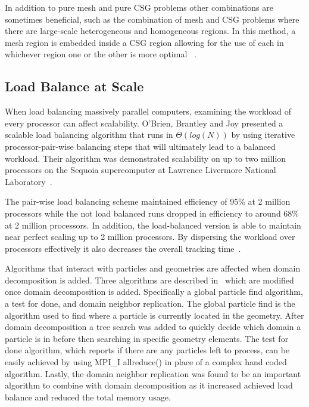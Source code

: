 In addition to pure mesh and pure CSG problems other combinations are sometimes beneficial, such as the combination of mesh and CSG problems where there are large-scale heterogeneous and homogeneous regions.
%
In this method, a mesh region is embedded inside a CSG region allowing for the use of each in whichever region one or the other is more optimal
~\cite{greenman2009enhancements}.

\subsection*{Load Balance at Scale}

%
When load balancing massively parallel computers, 
examining the workload of every processor can affect scalability.
%
O'Brien, Brantley and Joy presented a scalable load balancing algorithm that runs in $\Theta ( log ( N ) )$ by using iterative processor-pair-wise balancing steps that will ultimately lead to a balanced workload.
%
Their algorithm was demonstrated scalability on up to two million processors on the Sequoia supercomputer at Lawrence Livermore National Laboratory~\cite{o2013scalable}.
%

%
The pair-wise load balancing scheme maintained efficiency of 95\% at 2 million processors while the not load balanced runs dropped in efficiency to around 68\% at 2 million processors.
%
In addition, the load-balanced version is able to maintain near perfect scaling up to 2 million processors.
%
By dispersing the workload over processors effectively it also decreases the overall tracking time~\cite{o2013scalable}.
%

Algorithms that interact with particles and geometries are affected when domain decomposition is added.
%
Three algorithms are described in~\cite{o2015particle} which are modified once domain decomposition is added.
%
Specifically a global particle find algorithm, a test for done, and domain neighbor replication.
%
The global particle find is the algorithm used to find where a particle is currently located in the geometry.
%
After domain decomposition a tree search was added to quickly decide which domain a particle is in before then searching in specific geometry elements.
%
The test for done algorithm, which reports if there are any particles left to process, can be easily achieved by using MPI\_I allreduce() in place of a complex hand coded algorithm.
%
Lastly, the domain neighbor replication was found to be an important algorithm to combine with domain decomposition as it increased achieved load balance and reduced the total memory usage.
%


